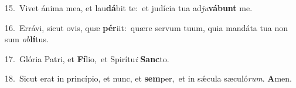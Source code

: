 {\numbfont\textcolor{\numbcolor}{15.}}~Vivet ánima mea, et lau\-\textbf{dá}\-bit te:~\star et judícia tua ad\-\textit{ju}\-\textbf{vá}\textbf{bunt} me.\par
{\numbfont\textcolor{\numbcolor}{16.}}~Errávi, sicut ovis, quæ \textbf{pér}\-iit:~\star quære servum tuum, quia mandáta tua non sum \textit{ob}\-\textbf{lí}tus.\par
{\numbfont\textcolor{\numbcolor}{17.}}~Glória Patri, et \textbf{Fí}\-lio,~\star et Spirítu\textit{i} \textbf{Sanc}\-to.\par
{\numbfont\textcolor{\numbcolor}{18.}}~Sicut erat in princípio, et nunc, et \textbf{sem}\-per,~\star et in sǽcula sæculó\-\textit{rum}\-. \textbf{A}\-men.\par

